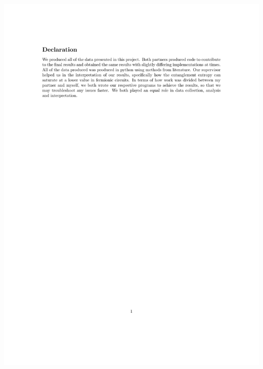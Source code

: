 \documentclass[aps]{revtex4-2}
\begin{document}
\includegraphics[width = \textwidth]{Report_Latex_template__1_.pdf}
\end{document}
